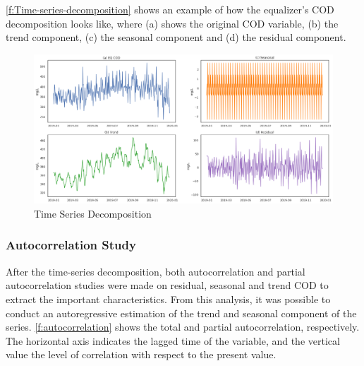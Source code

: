 \autoref{f:Time-series-decomposition} shows an example of how the equalizer’s COD decomposition looks like, where (a) shows the original COD variable, (b) the trend component, (c) the seasonal component and (d) the residual component.

\begin{figure}[h]
\centering
\includegraphics[width=\linewidth]{figures/Ch4/time_series_descompose.png}
\caption{Time Series Decomposition}
\label{f:Time-series-decomposition}
\end{figure}

\subsubsection{Autocorrelation Study}
\label{ss:autocorrelation}

After the time-series decomposition, both autocorrelation and partial autocorrelation studies were made on residual, seasonal and trend COD to extract the important characteristics. From this analysis, it was possible to conduct an autoregressive estimation of the trend and seasonal component of the series. \autoref{f:autocorrelation} shows the total and partial autocorrelation, respectively. The horizontal axis indicates the lagged time of the variable, and the vertical value the level of correlation with respect to the present value.


